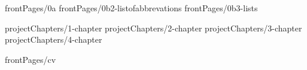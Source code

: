 \documentclass[a4paper,12pt,oneside,openany]{book}
\begin{document}
\onehalfspacing
{}

 {frontPages/0a}
 {frontPages/0b2-listofabbrevations}
 {frontPages/0b3-lists}

\onehalfspacing
\clearpage
{}

 {projectChapters/1-chapter}
 {projectChapters/2-chapter}
 {projectChapters/3-chapter}
 {projectChapters/4-chapter}

\newpage\appendix


\newpage
{}
\singlespacing
\printbibliography[title={\bibName}]

\ifnum{}
\newpage
 {frontPages/cv}
\fi
\end{document}

